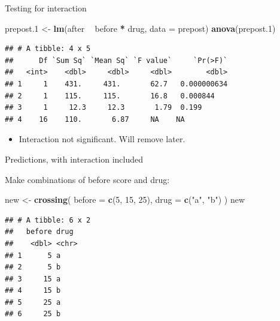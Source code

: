 \documentclass[
  ignorenonframetext,
]{beamer}
\newenvironment{Shaded}{\begin{snugshade}}{\end{snugshade}}
\newcommand{\DataTypeTok}[1]{\textcolor[rgb]{0.13,0.29,0.53}{#1}}
\newcommand{\DecValTok}[1]{\textcolor[rgb]{0.00,0.00,0.81}{#1}}
\newcommand{\FloatTok}[1]{\textcolor[rgb]{0.00,0.00,0.81}{#1}}
\newcommand{\KeywordTok}[1]{\textcolor[rgb]{0.13,0.29,0.53}{\textbf{#1}}}
\newcommand{\NormalTok}[1]{#1}
\newcommand{\OperatorTok}[1]{\textcolor[rgb]{0.81,0.36,0.00}{\textbf{#1}}}
\newcommand{\StringTok}[1]{\textcolor[rgb]{0.31,0.60,0.02}{#1}}
\providecommand{\tightlist}{%
  \setlength{\itemsep}{0pt}\setlength{\parskip}{0pt}}
\begin{document}
\begin{frame}[fragile]{Testing for interaction}
\protect\hypertarget{testing-for-interaction}{}

\begin{Shaded}
\begin{Highlighting}[]
\NormalTok{prepost}\FloatTok{.1}\NormalTok{ <-}\StringTok{ }\KeywordTok{lm}\NormalTok{(after }\OperatorTok{~}\StringTok{ }\NormalTok{before }\OperatorTok{*}\StringTok{ }\NormalTok{drug, }\DataTypeTok{data =}\NormalTok{ prepost)}
\KeywordTok{anova}\NormalTok{(prepost}\FloatTok{.1}\NormalTok{)}
\end{Highlighting}
\end{Shaded}

\begin{verbatim}
## # A tibble: 4 x 5
##      Df `Sum Sq` `Mean Sq` `F value`     `Pr(>F)`
##   <int>    <dbl>     <dbl>     <dbl>        <dbl>
## 1     1    431.     431.       62.7   0.000000634
## 2     1    115.     115.       16.8   0.000844   
## 3     1     12.3     12.3       1.79  0.199      
## 4    16    110.       6.87     NA    NA
\end{verbatim}

\begin{itemize}
\tightlist
\item
  Interaction not significant. Will remove later.
\end{itemize}

\end{frame}

\begin{frame}[fragile]{Predictions, with interaction included}
\protect\hypertarget{predictions-with-interaction-included}{}

Make combinations of before score and drug:

\begin{Shaded}
\begin{Highlighting}[]
\NormalTok{new <-}\StringTok{ }\KeywordTok{crossing}\NormalTok{(}
  \DataTypeTok{before =} \KeywordTok{c}\NormalTok{(}\DecValTok{5}\NormalTok{, }\DecValTok{15}\NormalTok{, }\DecValTok{25}\NormalTok{),}
  \DataTypeTok{drug =} \KeywordTok{c}\NormalTok{(}\StringTok{"a"}\NormalTok{, }\StringTok{"b"}\NormalTok{)}
\NormalTok{)}
\NormalTok{new}
\end{Highlighting}
\end{Shaded}

\begin{verbatim}
## # A tibble: 6 x 2
##   before drug 
##    <dbl> <chr>
## 1      5 a    
## 2      5 b    
## 3     15 a    
## 4     15 b    
## 5     25 a    
## 6     25 b
\end{verbatim}

\end{frame}
\end{document}
